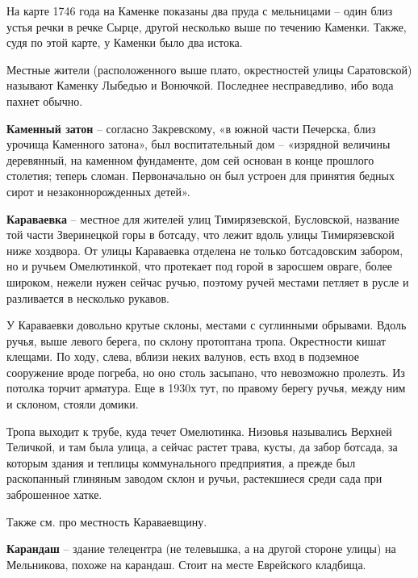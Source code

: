 На карте 1746 года на Каменке показаны два пруда с мельницами – один близ устья речки в речке Сырце, другой несколько выше по течению Каменки. Также, судя по этой карте, у Каменки было два истока.

Местные жители (расположенного выше плато, окрестностей улицы Саратовской) называют Каменку Лыбедью и Вонючкой. Последнее несправедливо, ибо вода пахнет обычно.\\

\medskip

\textbf{Каменный затон} – согласно Закревскому, «в южной части Печерска, близ урочища Каменного затона», был воспитательный дом – «изрядной величины деревянный, на каменном фундаменте, дом сей основан в конце прошлого столетия; теперь сломан. Первоначально он был устроен для принятия бедных сирот и незаконнорожденных детей».\\

\medskip

\textbf{Караваевка} – местное для жителей улиц Тимирязевской, Бусловской, название той части Зверинецкой горы в ботсаду, что лежит вдоль улицы Тимирязевской ниже хоздвора. От улицы Караваевка отделена не только ботсадовским забором, но и ручьем Омелютинкой, что протекает под горой в заросшем овраге, более широком, нежели нужен сейчас ручью, поэтому ручей местами петляет в русле и разливается в несколько рукавов.

У Караваевки довольно крутые склоны, местами с суглинными обрывами. Вдоль ручья, выше левого берега, по склону протоптана тропа. Окрестности кишат клещами. По ходу, слева, вблизи неких валунов, есть вход в подземное сооружение вроде погреба, но оно столь засыпано, что невозможно пролезть. Из потолка торчит арматура. Еще в 1930х тут, по правому берегу ручья, между ним и склоном, стояли домики.

Тропа выходит к трубе, куда течет Омелютинка. Низовья назывались Верхней Теличкой, и там была улица, а сейчас растет трава, кусты, да забор ботсада, за которым здания и теплицы коммунального предприятия, а прежде был раскопанный глиняным заводом склон и ручьи, растекшиеся среди сада при заброшенное хатке. 

Также см. про местность Караваевщину.\\ 

\medskip


\textbf{Карандаш} – здание телецентра (не телевышка, а на другой стороне улицы) на Мельникова, похоже на карандаш. Стоит на месте Еврейского кладбища.\\

